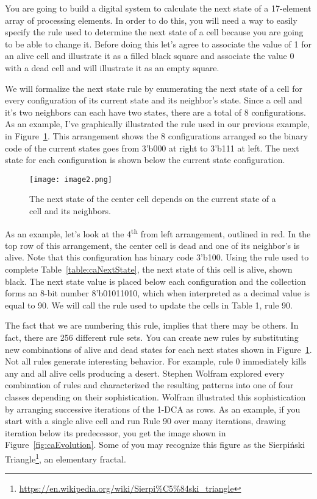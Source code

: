 You are going to build a digital system to calculate the next state of a
17-element array of processing elements. In order to do this, you will
need a way to easily specify the rule used to determine the next state
of a cell because you are going to be able to change it. Before doing
this let's agree to associate the value of 1 for an alive cell and
illustrate it as a filled black square and associate the value 0 with a
dead cell and will illustrate it as an empty square.

We will formalize the next state rule by enumerating the next state of a
cell for every configuration of its current state and its neighbor's
state. Since a cell and it's two neighbors can each have two states,
there are a total of 8 configurations. As an example, I've graphically
illustrated the rule used in our previous example, in Figure~\ref{fig:caRule}. This
arrangement shows the 8 configurations arranged so the binary code of
the current states goes from 3'b000 at right to 3'b111 at left. The next
state for each configuration is shown below the current state
configuration.

\begin{figure}
\texttt{[image: image2.png]}
\caption{The next state of the center cell depends on the current state
of a cell and its neighbors.}
\label{fig:caRule}
\end{figure}

As an example, let's look at the 4\textsuperscript{th} from left
arrangement, outlined in red. In the top row of this arrangement, the
center cell is dead and one of its neighbor's is alive. Note that this
configuration has binary code 3'b100. Using the rule used to complete
Table~\ref{table:caNextState}, the next state of this cell is alive, shown black. The next
state value is placed below each configuration and the collection forms
an 8-bit number 8'b01011010, which when interpreted as a decimal value
is equal to 90. We will call the rule used to update the cells in Table
1, rule 90.

The fact that we are numbering this rule, implies that there may be
others. In fact, there are 256 different rule sets. You can create new
rules by substituting new combinations of alive and dead states for each
next states shown in Figure~\ref{fig:caRule}. Not all rules generate interesting
behavior. For example, rule 0 immediately kills any and all alive cells
producing a desert. Stephen Wolfram explored every combination of rules
and characterized the resulting patterns into one of four classes
depending on their sophistication. Wolfram illustrated this
sophistication by arranging successive iterations of the 1-DCA as rows.
As an example, if you start with a single alive cell and run Rule 90
over many iterations, drawing iteration below its predecessor, you get
the image shown in Figure~\ref{fig:caEvolution}. Some of you may recognize this figure as
the Sierpiński Triangle\footnote{\url{https://en.wikipedia.org/wiki/Sierpi\%C5\%84ski_triangle}},
an elementary fractal.

